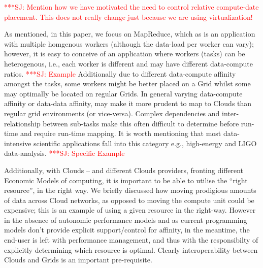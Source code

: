 \documentclass[conference,final]{IEEEtran}
\newcommand{\jhanote}[1]{ {\textcolor{red} { ***SJ: #1 }}}
\newcommand{\jhanote}[1]{}
\begin{document}
\jhanote{Mention how we have motivated the need to control
  relative compute-date placement. This does not really change
  just because we are using virtualization!}


As mentioned, in this paper, we focus on MapReduce, which as is an
application with multiple homgenous workers (although the data-load
per worker can vary); however, it is easy to conceive of an
application where workers (tasks) can be heterogenous, i.e., each
worker is different and may have different data-compute ratios.
\jhanote{Example} Additionally due to different data-compute affinity
amongst the tasks, some workers might be better placed on a Grid
whilst some may optimally be located on regular Grids.  In general
varying data-compute affinity or data-data affinity, may make it more
prudent to map to Clouds than regular grid environments (or
vice-versa).  Complex dependencies and inter-relationship between
sub-tasks make this often difficult to determine before run-time and
require run-time mapping. It is worth mentioning that most
data-intensive scientific applications fall into this category e.g.,
high-energy and LIGO data-analysis.  \jhanote{Specific Example}

Additionally, with Clouds -- and different Clouds providers, fronting
different Economic Models of computing, it is important to be able to
utilise the ``right resource'', in the right way. We briefly discussed
how moving prodigious amounts of data across Cloud networks, as
opposed to moving the compute unit could be expensive; this is an
example of using a given resource in the right-way. However in the
absence of autonomic performance models and as current programming
models don't provide explicit support/control for affinity, in the
meantime, the end-user is left with performance management, and thus
with the responsibilty of explicitly determining which resource is
optimal. Clearly interoperability between Clouds and Grids is an
important pre-requisite.

\end{document}

